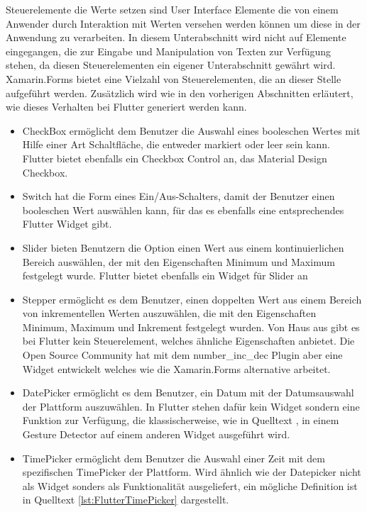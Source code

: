 Steuerelemente die Werte setzen sind User Interface Elemente die von einem Anwender durch Interaktion mit Werten versehen werden können um diese in der Anwendung zu verarbeiten.  In diesem Unterabschnitt wird nicht auf Elemente eingegangen,  die zur Eingabe und Manipulation von Texten zur Verfügung stehen, da diesen Steuerelementen ein eigener Unterabschnitt gewährt wird.  Xamarin.Forms bietet eine Vielzahl von Steuerelementen, die an dieser Stelle aufgeführt werden. Zusätzlich wird wie in den vorherigen Abschnitten erläutert, wie dieses Verhalten bei Flutter generiert werden kann. 
\begin{itemize}
\setlength\itemsep{-0.6em}
 \item CheckBox ermöglicht dem Benutzer die Auswahl eines booleschen Wertes mit Hilfe einer Art Schaltfläche, die entweder markiert oder leer sein kann. Flutter bietet ebenfalls ein Checkbox Control an,  das Material Design Checkbox. 
  \item Switch hat die Form eines Ein/Aus-Schalters, damit der Benutzer einen booleschen Wert auswählen kann, für das es ebenfalls eine entsprechendes Flutter Widget gibt. 
 \item Slider bieten Benutzern die Option einen  Wert aus einem kontinuierlichen Bereich auswählen, der mit den Eigenschaften Minimum und Maximum festgelegt wurde.  Flutter bietet ebenfalls ein Widget für Slider an
 \item Stepper ermöglicht es dem Benutzer, einen doppelten Wert aus einem Bereich von inkrementellen Werten auszuwählen, die mit den Eigenschaften Minimum, Maximum und Inkrement festgelegt wurden.  Von Haus aus gibt es bei Flutter kein Steuerelement,  welches ähnliche Eigenschaften anbietet.  Die Open Source Community hat mit dem number\_inc\_dec Plugin aber eine Widget entwickelt welches wie die Xamarin.Forms alternative arbeitet. 
 \item DatePicker ermöglicht es dem Benutzer, ein Datum mit der Datumsauswahl der Plattform auszuwählen.  In Flutter stehen dafür kein Widget sondern eine Funktion zur Verfügung,  die klassischerweise, wie in Quelltext , in einem Gesture Detector auf einem anderen Widget ausgeführt wird.  
 \item TimePicker ermöglicht dem Benutzer die Auswahl einer Zeit mit dem spezifischen TimePicker der Plattform.  Wird ähnlich wie der Datepicker nicht als Widget sonders als Funktionalität ausgeliefert,  ein mögliche Definition ist in Quelltext \ref{lst:FlutterTimePicker} dargestellt.
 
 \begin{minipage}{\linewidth}

\end{minipage}

\end{itemize}

